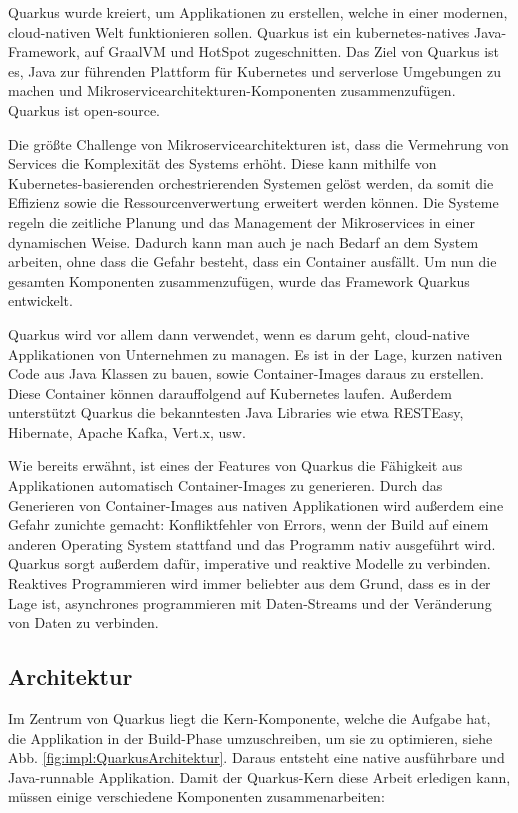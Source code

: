  
Quarkus wurde kreiert, um Applikationen zu erstellen, welche in einer modernen, cloud-nativen Welt funktionieren sollen. Quarkus ist ein kubernetes-natives Java-Framework, auf GraalVM und HotSpot zugeschnitten. Das Ziel von Quarkus ist es, Java zur führenden Plattform für Kubernetes und serverlose Umgebungen zu machen und Mikroservicearchitekturen-Komponenten zusammenzufügen. Quarkus ist open-source. \cite{quarkusOfficialSite}
 
Die größte Challenge von Mikroservicearchitekturen ist, dass die Vermehrung von Services die Komplexität des Systems erhöht. Diese kann mithilfe von Kubernetes-basierenden orchestrierenden Systemen gelöst werden, da somit die Effizienz sowie die Ressourcenverwertung erweitert werden können. Die Systeme regeln die zeitliche Planung und das Management der Mikroservices in einer dynamischen Weise. Dadurch kann man auch je nach Bedarf an dem System arbeiten, ohne dass die Gefahr besteht, dass ein Container ausfällt. Um nun die gesamten Komponenten zusammenzufügen, wurde das Framework Quarkus entwickelt.
 
Quarkus wird vor allem dann verwendet, wenn es darum geht, cloud-native Applikationen von Unternehmen zu managen. Es ist in der Lage, kurzen nativen Code aus Java Klassen zu bauen, sowie Container-Images daraus zu erstellen. Diese Container können darauffolgend auf Kubernetes laufen. Außerdem unterstützt Quarkus die bekanntesten Java Libraries wie etwa RESTEasy, Hibernate, Apache Kafka, Vert.x, usw.
 
Wie bereits erwähnt, ist eines der Features von Quarkus die Fähigkeit aus Applikationen automatisch Container-Images zu generieren. Durch das Generieren von Container-Images aus nativen Applikationen wird außerdem eine Gefahr zunichte gemacht: Konfliktfehler von Errors, wenn der Build auf einem anderen Operating System stattfand und das Programm nativ ausgeführt wird.
Quarkus sorgt außerdem dafür, imperative und reaktive Modelle zu verbinden. Reaktives Programmieren wird immer beliebter aus dem Grund, dass es in der Lage ist, asynchrones programmieren mit Daten-Streams und der Veränderung von Daten zu verbinden. \cite{QuarkusBuch}
 
\subsection{Architektur}
Im Zentrum von Quarkus liegt die Kern-Komponente, welche die Aufgabe hat, die Applikation in der Build-Phase umzuschreiben, um sie zu optimieren, siehe Abb. \ref{fig:impl:QuarkusArchitektur}. Daraus entsteht eine native ausführbare und Java-runnable Applikation. Damit der Quarkus-Kern diese Arbeit erledigen kann, müssen einige verschiedene Komponenten zusammenarbeiten:
 
